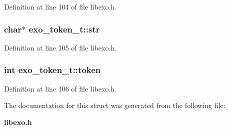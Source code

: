 Definition at line 104 of file libexo.h.
\subsubsection[{str}]{\setlength{\rightskip}{0pt plus 5cm}char$\ast$ {\bf exo\_\-token\_\-t::str}}\label{structexo__token__t_e12cddf9f550d347bccdc61e63e06dd3}




Definition at line 105 of file libexo.h.
\subsubsection[{token}]{\setlength{\rightskip}{0pt plus 5cm}int {\bf exo\_\-token\_\-t::token}}\label{structexo__token__t_65806efbaf7d0bdce230cb8a076a0d34}




Definition at line 106 of file libexo.h.

The documentation for this struct was generated from the following file:\begin{CompactItemize}
\item 
{\bf libexo.h}\end{CompactItemize}
